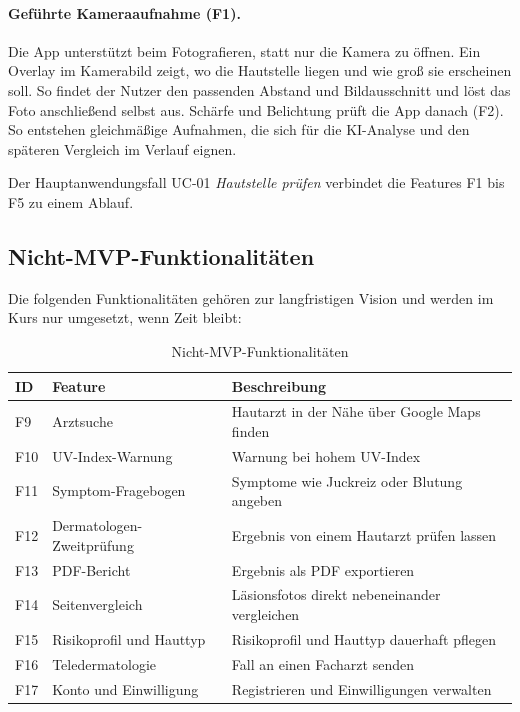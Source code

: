 \paragraph{Geführte Kameraaufnahme (F1).} Die App unterstützt beim Fotografieren, statt nur die Kamera zu öffnen. Ein Overlay im Kamerabild zeigt, wo die Hautstelle liegen und wie groß sie erscheinen soll. So findet der Nutzer den passenden Abstand und Bildausschnitt und löst das Foto anschließend selbst aus. Schärfe und Belichtung prüft die App danach (F2). So entstehen gleichmäßige Aufnahmen, die sich für die KI-Analyse und den späteren Vergleich im Verlauf eignen.

Der Hauptanwendungsfall UC-01 \emph{Hautstelle prüfen} verbindet die Features F1 bis F5 zu einem Ablauf.

\subsection{Nicht-MVP-Funktionalitäten}
\label{sec:nicht-mvp}

Die folgenden Funktionalitäten gehören zur langfristigen Vision und werden im Kurs nur umgesetzt, wenn Zeit bleibt:

\begin{table}[htbp]
\caption{Nicht-MVP-Funktionalitäten}
\label{tab:nicht-mvp}
\footnotesize
\renewcommand{\arraystretch}{1.15}
\begin{tabularx}{\textwidth}{@{}l >{\RaggedRight\arraybackslash}p{4.2cm} X@{}}
\toprule
\textbf{ID} & \textbf{Feature} & \textbf{Beschreibung} \\
\midrule
F9 & Arztsuche & Hautarzt in der Nähe über Google Maps finden \\
F10 & UV-Index-Warnung & Warnung bei hohem UV-Index \\
F11 & Symptom-Fragebogen & Symptome wie Juckreiz oder Blutung angeben \\
F12 & Dermatologen-Zweitprüfung & Ergebnis von einem Hautarzt prüfen lassen \\
F13 & PDF-Bericht & Ergebnis als PDF exportieren \\
F14 & Seitenvergleich & Läsionsfotos direkt nebeneinander vergleichen \\
F15 & Risikoprofil und Hauttyp & Risikoprofil und Hauttyp dauerhaft pflegen \\
F16 & Teledermatologie & Fall an einen Facharzt senden \\
F17 & Konto und Einwilligung & Registrieren und Einwilligungen verwalten \\
\bottomrule
\end{tabularx}
\end{table}

